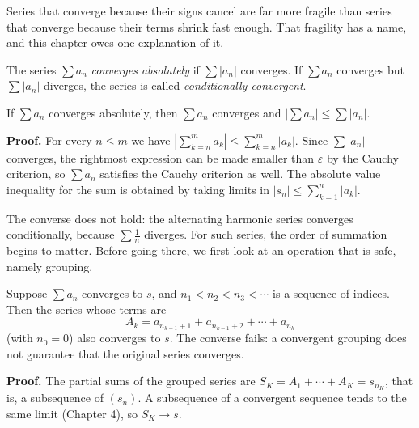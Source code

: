 Series that converge because their signs cancel are far more fragile than series that
converge because their terms shrink fast enough. That fragility has a name, and this
chapter owes one explanation of it.

\begin{definisi}
The series $\sum a_n$ \emph{converges absolutely} if $\sum |a_n|$ converges. If
$\sum a_n$ converges but $\sum |a_n|$ diverges, the series is called
\emph{conditionally convergent}.
\end{definisi}


\begin{teorema}
If $\sum a_n$ converges absolutely, then $\sum a_n$ converges and
$\left| \sum a_n \right| \le \sum |a_n|$.
\end{teorema}

\noindent\textbf{Proof.} For every $n \le m$ we have
$\left| \sum_{k=n}^{m} a_k \right| \le \sum_{k=n}^{m} |a_k|$. Since $\sum |a_n|$
converges, the rightmost expression can be made smaller than $\varepsilon$ by the Cauchy
criterion, so $\sum a_n$ satisfies the Cauchy criterion as well. The absolute value
inequality for the sum is obtained by taking limits in
$\left| s_n \right| \le \sum_{k=1}^{n} |a_k|$.

The converse does not hold: the alternating harmonic series converges conditionally,
because $\sum \frac{1}{n}$ diverges. For such series, the order of summation begins to
matter. Before going there, we first look at an operation that is safe, namely
grouping.

\begin{proposisi}[Grouping]
Suppose $\sum a_n$ converges to $s$, and $n_1 < n_2 < n_3 < \cdots$ is a sequence of
indices. Then the series whose terms are
\[
  A_k = a_{n_{k-1}+1} + a_{n_{k-1}+2} + \cdots + a_{n_k}
\]
(with $n_0 = 0$) also converges to $s$. The converse fails: a convergent grouping does not
guarantee that the original series converges.
\end{proposisi}

\noindent\textbf{Proof.} The partial sums of the grouped series are
$S_K = A_1 + \cdots + A_K = s_{n_K}$, that is, a subsequence of $(s_n)$. A subsequence of a
convergent sequence tends to the same limit (Chapter 4), so $S_K \to s$.

